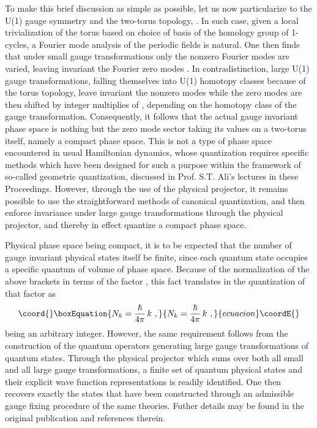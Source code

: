 \documentclass[a4paper,11pt]{article}
\begin{document}
To make this brief discussion as simple as possible, let us now particularize
to the U(1) gauge symmetry and the two-torus topology, \coordHE{}. In such
case, given a local trivialization of the torus based on choice of basis
of the homology group of 1-cycles, a Fourier mode analysis of the periodic
fields \coordHE{} is natural. One then finds that under small gauge 
transformations only the nonzero Fourier modes are varied, leaving invariant
the Fourier zero modes \coordHE{}. In contradistinction, large U(1) gauge
transformations, falling themselves into U(1) homotopy classes because of
the torus topology, leave invariant the nonzero modes while the
zero modes are then shifted by integer multiplies of \myHighlight{$2\pi$}\coordHE{}, depending
on the homotopy class of the gauge transformation. Consequently, it
follows that the actual gauge invariant phase space is nothing but the
zero mode sector taking its values on a two-torus itself, namely a compact
phase space. This is not a type of phase space encountered in usual
Hamiltonian dynamics, whose quantization requires specific methods
which have been designed for such a purpose within the framework of
so-called geometric quantization, discussed in Prof. S.T. Ali's lectures
in these Proceedings.
However, through the use of the physical projector, it remains possible
to use the straightforward methods of canonical quantization, and then
enforce invariance under large gauge transformations through the physical
projector, and thereby in effect quantize a compact phase space.

Physical phase space being compact, it is to be expected that the number of
gauge invariant physical states itself be finite, since each quantum state
occupies a specific quantum of volume of phase space. Because of the
nor\-ma\-li\-za\-tion of the above brackets in terms of the factor \coordHE{}, 
this fact translates in the quantization of that factor as
\begin{equation}\coord{}\boxEquation{
N_k=\frac{\hbar}{4\pi}\,k\ ,
}{
N_k=\frac{\hbar}{4\pi}\,k\ ,
}{ecuacion}\coordE{}\end{equation}
\coordHE{} being an arbitrary integer. However, the same requirement follows
from the construction of the quantum operators generating large gauge
transformations of quantum states. Through the physical projector
which sums over both all small and all large gauge transformations,
a finite set of quantum physical states and their explicit wave
function representations is readily identified. One then recovers exactly
the states that have been constructed through an admissible
gauge fixing procedure of the same theories. Futher details may be
found in the original publication and references therein.\cite{JG2bis,JG9}
\end{document}
